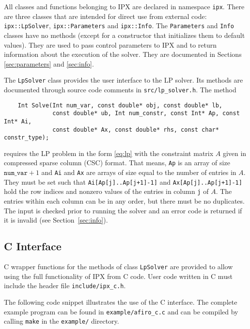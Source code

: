 \documentclass{article}
\newcommand{\ct}{\texttt}
\begin{document}
\newpage
All classes and functions belonging to IPX are declared in namespace \ct{ipx}.
There are three classes that are intended for direct use from external code:
\ct{ipx::LpSolver}, \ct{ipx::Parameters} and \ct{ipx::Info}. The \ct{Parameters}
and \ct{Info} classes have no methods (except for a constructor that initializes
them to default values). They are used to pass control parameters to IPX and to
return information about the execution of the solver. They are documented in
Sections \ref{sec:parameters} and \ref{sec:info}.

The \ct{LpSolver} class provides the user interface to the LP solver. Its
methods are documented through source code comments in \ct{src/lp\_solver.h}.
The method
\begin{verbatim}
    Int Solve(Int num_var, const double* obj, const double* lb,
              const double* ub, Int num_constr, const Int* Ap, const Int* Ai,
              const double* Ax, const double* rhs, const char* constr_type);
\end{verbatim}
requires the LP problem in the form \eqref{eq:lp} with the constraint matrix $A$
given in compressed sparse column (CSC) format. That means, \ct{Ap} is an array
of size $\ct{num\_var}+1$ and \ct{Ai} and \ct{Ax} are arrays of size equal to
the number of entries in $A$. They must be set such that
\ct{Ai[Ap[j]..Ap[j+1]-1]} and \ct{Ax[Ap[j]..Ap[j+1]-1]} hold the row indices and
nonzero values of the entries in column \ct{j} of $A$. The entries within each
column can be in any order, but there must be no duplicates. The input is
checked prior to running the solver and an error code is returned if it is
invalid (see Section~\ref{sec:info}).

\subsection{C Interface}
C wrapper functions for the methods of class \ct{LpSolver} are provided to allow
using the full functionality of IPX from C code. User code written in C must
include the header file \ct{include/ipx\_c.h}.

The following code snippet illustrates the use of the C interface. The
complete example program can be found in \ct{example/afiro\_c.c} and can be
compiled by calling \ct{make} in the \ct{example/} directory.
\end{document}
